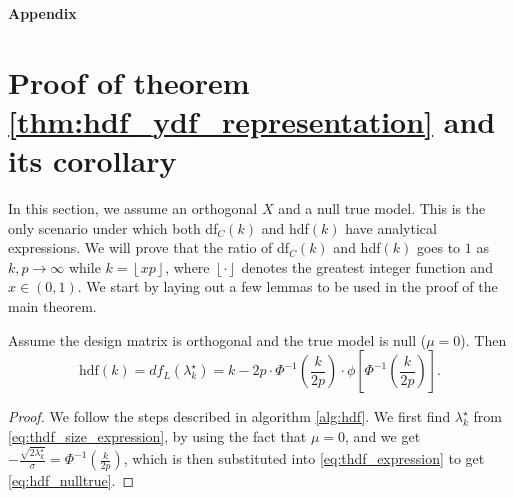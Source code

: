 \clearpage 
\appendix
\begin{center}
\textbf{\huge Appendix}
\end{center}
\section{Proof of theorem \ref{thm:hdf_ydf_representation} and its corollary}
\label{sec:proof_hdf_ydf}
In this section, we assume an orthogonal $X$ and a null true model. This is the only scenario under which both df$_C(k)$ and hdf$(k)$ have analytical expressions. We will prove that the ratio of df$_C(k)$ and hdf$(k)$ goes to $1$ as $k,p\rightarrow \infty$ while $k=\left \lfloor{xp}\right \rfloor $, where $\left \lfloor{\cdot}\right \rfloor$ denotes the greatest integer function and $x\in(0,1)$. We start by laying out a few lemmas to be used in the proof of the main theorem.
\begin{lemma}
	\label{lemma:hdf_nulltrue}
	Assume the design matrix is orthogonal and the true model is null ($\mu=0$). Then
	\begin{equation}
	\text{hdf}(k) = df_L(\lambda_k^\star) = k - 2p\cdot \Phi^{-1} (\frac{k}{2p}) \cdot \phi\left[\Phi^{-1}(\frac{k}{2p}) \right].
	\label{eq:hdf_nulltrue}
	\end{equation}
\end{lemma}
\begin{proof}
	We follow the steps described in algorithm \ref{alg:hdf}. We first find $\lambda_k^\star$ from \eqref{eq:thdf_size_expression}, by using the fact that $\mu=0$, and we get $\displaystyle -\frac{\sqrt{2\lambda_k^\star}}{\sigma} = \displaystyle \Phi^{-1}(\frac{k}{2p})$, which is then substituted into \eqref{eq:thdf_expression} to get \eqref{eq:hdf_nulltrue}.
\end{proof}

